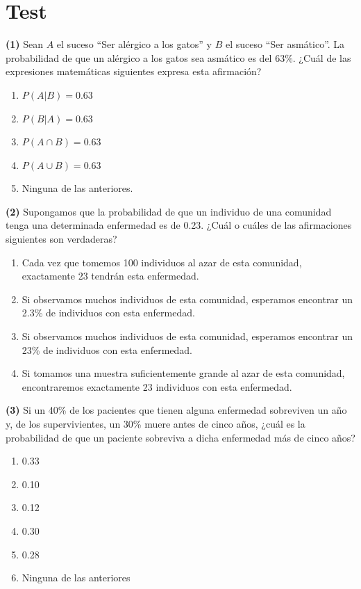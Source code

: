 \documentclass[
]{book}
\providecommand{\tightlist}{%
  \setlength{\itemsep}{0pt}\setlength{\parskip}{0pt}}
\theoremstyle{definition}
\theoremstyle{definition}
\theoremstyle{definition}
\theoremstyle{definition}
\theoremstyle{remark}
\begin{document}
\hypertarget{test-2}{%
\section{Test}\label{test-2}}

\textbf{(1)} Sean \(A\) el suceso ``Ser alérgico a los gatos'' y \(B\) el suceso ``Ser asmático''. La probabilidad de que un alérgico a los gatos sea asmático es del 63\%. ¿Cuál de las expresiones matemáticas siguientes expresa esta afirmación?

\begin{enumerate}
\def\labelenumi{\arabic{enumi}.}
\tightlist
\item
  \(P(A|B)=0.63\)
\item
  \(P(B|A)=0.63\)
\item
  \(P(A\cap B)=0.63\)
\item
  \(P(A\cup B)=0.63\)
\item
  Ninguna de las anteriores.
\end{enumerate}

\textbf{(2)} Supongamos que la probabilidad de que un individuo de una comunidad tenga una determinada enfermedad es de 0.23. ¿Cuál o cuáles de las afirmaciones siguientes son verdaderas?

\begin{enumerate}
\def\labelenumi{\arabic{enumi}.}
\tightlist
\item
  Cada vez que tomemos 100 individuos al azar de esta comunidad, exactamente 23 tendrán esta enfermedad.
\item
  Si observamos muchos individuos de esta comunidad, esperamos encontrar un 2.3\% de individuos con esta enfermedad.
\item
  Si observamos muchos individuos de esta comunidad, esperamos encontrar un 23\% de individuos con esta enfermedad.
\item
  Si tomamos una muestra suficientemente grande al azar de esta comunidad, encontraremos exactamente 23 individuos con esta enfermedad.
\end{enumerate}

\textbf{(3)} Si un 40\% de los pacientes que tienen alguna enfermedad sobreviven un año y, de los supervivientes, un 30\% muere antes de cinco años, ¿cuál es la probabilidad de que un paciente sobreviva a dicha enfermedad más de cinco años?

\begin{enumerate}
\def\labelenumi{\arabic{enumi}.}
\tightlist
\item
  0.33
\item
  0.10
\item
  0.12
\item
  0.30
\item
  0.28
\item
  Ninguna de las anteriores
\end{enumerate}
\end{document}

